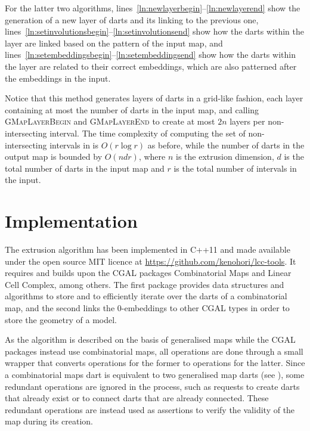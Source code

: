 For the latter two algorithms, lines~\ref{ln:newlayerbegin}--\ref{ln:newlayerend} show the generation of a new layer of darts and its linking to the previous one, lines~\ref{ln:setinvolutionsbegin}--\ref{ln:setinvolutionsend} show how the darts within the layer are linked based on the pattern of the input map, and lines~\ref{ln:setembeddingsbegin}--\ref{ln:setembeddingsend} show how the darts within the layer are related to their correct embeddings, which are also patterned after the embeddings in the input.

Notice that this method generates layers of darts in a grid-like fashion, each layer containing at most the number of darts in the input map, and calling \textsc{GMapLayerBegin} and \textsc{GMapLayerEnd} to create at most $2n$ layers per non-intersecting interval.
The time complexity of computing the set of non-intersecting intervals in  is $O(r \log r)$ as before, while the number of darts in the output map is bounded by $O(ndr)$, where $n$ is the extrusion dimension, $d$ is the total number of darts in the input map and $r$ is the total number of intervals in the input.

\section{Implementation}
\label{se:extrusion-implementation}

The extrusion algorithm has been implemented in C++11 and made available under the open source MIT licence at \url{https://github.com/kenohori/lcc-tools}.
It requires and builds upon the CGAL packages Combinatorial Maps and Linear Cell Complex, among others.
The first package provides data structures and algorithms to store and to efficiently iterate over the darts of a combinatorial map, and the second links the 0-embeddings to other CGAL types in order to store the geometry of a model.

As the algorithm is described on the basis of generalised maps while the CGAL packages instead use combinatorial maps, all operations are done through a small wrapper that converts operations for the former to operations for the latter.
Since a combinatorial maps dart is equivalent to two generalised map darts (see ), some redundant operations are ignored in the process, such as requests to create darts that already exist or to connect darts that are already connected.
These redundant operations are instead used as assertions to verify the validity of the map during its creation.

